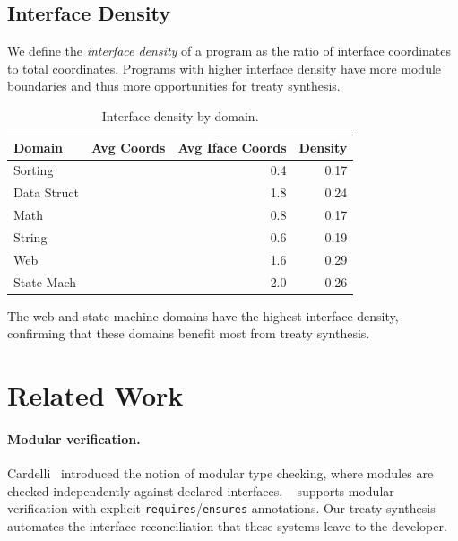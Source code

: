 \documentclass[11pt]{article}
\begin{document}
\subsection{Interface Density}

We define the \emph{interface density} of a program as the ratio of
interface coordinates to total coordinates.  Programs with higher
interface density have more module boundaries and thus more
opportunities for treaty synthesis.

\begin{table}[H]
\centering
\caption{Interface density by domain.}\label{tab:density}
\begin{tabular}{@{}l r r r@{}}
\toprule
\textbf{Domain} & \textbf{Avg Coords} & \textbf{Avg Iface Coords}
  & \textbf{Density} \\
\midrule
Sorting     & \expDomainSortAvgCoords{} & 0.4 & 0.17 \\
Data Struct & \expDomainDsAvgCoords{}   & 1.8 & 0.24 \\
Math        & \expDomainMathAvgCoords{} & 0.8 & 0.17 \\
String      & \expDomainStrAvgCoords{}  & 0.6 & 0.19 \\
Web         & \expDomainWebAvgCoords{}  & 1.6 & 0.29 \\
State Mach  & \expDomainSmAvgCoords{}   & 2.0 & 0.26 \\
\bottomrule
\end{tabular}
\end{table}

The web and state machine domains have the highest interface density,
confirming that these domains benefit most from treaty synthesis.

\section{Related Work}\label{sec:related}

\paragraph{Modular verification.}
Cardelli~\cite{cardelli} introduced the notion of modular type
checking, where modules are checked independently against declared
interfaces.  \Dafny{}~\cite{dafny} supports modular verification
with explicit \texttt{requires}/\texttt{ensures} annotations.
Our treaty synthesis automates the interface reconciliation that
these systems leave to the developer.
\end{document}
